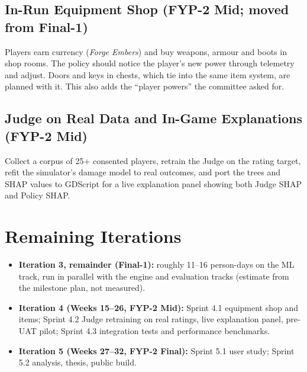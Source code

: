 \subsection{In-Run Equipment Shop (FYP-2 Mid; moved from Final-1)}
Players earn currency (\textit{Forge Embers}) and buy weapons, armour and boots in shop rooms. The policy should notice the player's new power through telemetry and adjust. Doors and keys in chests, which tie into the same item system, are planned with it. This also adds the ``player powers'' the committee asked for.

\subsection{Judge on Real Data and In-Game Explanations (FYP-2 Mid)}
Collect a corpus of 25+ consented players, retrain the Judge on the rating target, refit the simulator's damage model to real outcomes, and port the trees and SHAP values to GDScript for a live explanation panel showing both Judge SHAP and Policy SHAP.

\section{Remaining Iterations}
\begin{itemize}
    \item \textbf{Iteration 3, remainder (Final-1):} roughly 11--16 person-days on the ML track, run in parallel with the engine and evaluation tracks (estimate from the milestone plan, not measured).
    \item \textbf{Iteration 4 (Weeks 15--26, FYP-2 Mid):} Sprint 4.1 equipment shop and items; Sprint 4.2 Judge retraining on real ratings, live explanation panel, pre-UAT pilot; Sprint 4.3 integration tests and performance benchmarks.
    \item \textbf{Iteration 5 (Weeks 27--32, FYP-2 Final):} Sprint 5.1 user study; Sprint 5.2 analysis, thesis, public build.
\end{itemize}

